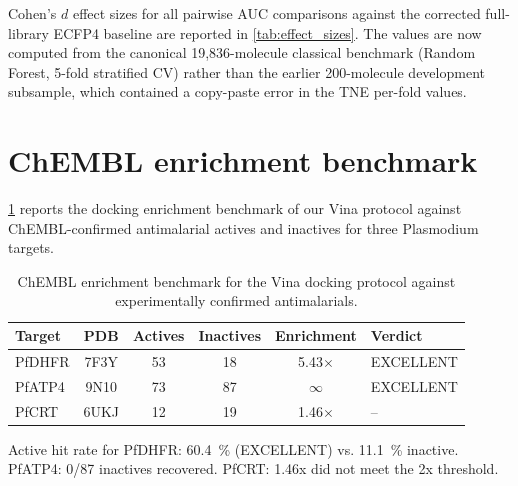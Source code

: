 \documentclass[11pt,a4paper]{article}
\begin{document}
Cohen's $d$ effect sizes for all pairwise AUC comparisons against the corrected full-library ECFP4 baseline are reported in \cref{tab:effect_sizes}. The values are now computed from the canonical 19,836-molecule classical benchmark (Random Forest, 5-fold stratified CV) rather than the earlier 200-molecule development subsample, which contained a copy-paste error in the TNE per-fold values.





\section{ChEMBL enrichment benchmark}
\label{sec:chembl_enrichment}

\cref{tab:chembl_enrichment} reports the docking enrichment benchmark of our Vina protocol against ChEMBL-confirmed antimalarial actives and inactives for three Plasmodium targets.

\begin{table}[htbp]
\centering
\caption{ChEMBL enrichment benchmark for the Vina docking protocol against experimentally confirmed antimalarials.}
\label{tab:chembl_enrichment}
\begin{tabularx}{\textwidth}{l c c c c l}
\toprule
Target & PDB & {Actives} & {Inactives} & {Enrichment} & Verdict \\
\midrule
PfDHFR & 7F3Y & 53 & 18 & 5.43$\times$ & EXCELLENT \\
PfATP4 & 9N10 & 73 & 87 & $\infty$ & EXCELLENT \\
PfCRT & 6UKJ & 12 & 19 & 1.46$\times$ & -- \\
\bottomrule
\end{tabularx}
\vspace{1mm}
\footnotesize Active hit rate for PfDHFR: \qty{60.4}{\percent} (EXCELLENT) vs. \qty{11.1}{\percent} inactive. PfATP4: 0/87 inactives recovered. PfCRT: 1.46x did not meet the 2x threshold.
\end{table}



\end{document}
